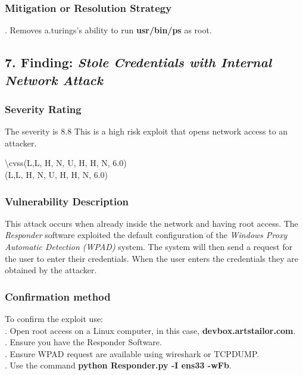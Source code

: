 \documentclass[notitlepage]{article}
\begin{document}
	\subsubsection{Mitigation or Resolution Strategy}
	\indent {}. Removes a.turings's ability to run \textbf{usr/bin/ps} as root. 
		
	
		
		\subsection{7. Finding: \emph{Stole Credentials with Internal Network Attack}}
		
		\subsubsection{Severity Rating}
		\indent The severity is 8.8 This is a high risk exploit that opens network access to an attacker. 
		
		\textbackslash cvss(L,L, H, N, U, H, H, N, 6.0)\\
		\cvss(L,L, H, N, U, H, H, N, 6.0) \\
		
		\subsubsection{Vulnerability Description}
		\indent This attack occurs when already inside the network and having root access. The \textit{Responder} software exploited the default configuration of the \textit{Windows Proxy Automatic Detection (WPAD)} system.  The system will then send a request for the user to enter their credentials.  When the user enters the credentials they are obtained by the attacker.  
		
		\subsubsection{Confirmation method}
		To confirm the exploit use: \\
		. Open root access on a Linux computer, in this case, \textbf{devbox.artstailor.com}. \\
		. Ensure you have the Responder Software. \\
		. Ensure WPAD request are available using wireshark or TCPDUMP. \\
		. Use the command \textbf{python Responder.py -I ens33 -wFb}.\\
		
\end{document}
